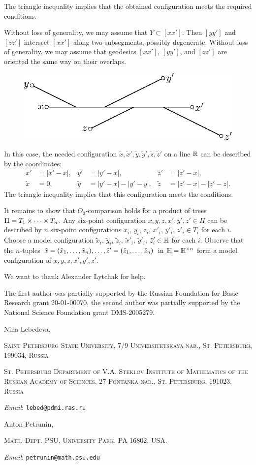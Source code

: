 \documentclass{article}
\makeatletter
\newcommand{\Addresses}{{\bigskip\footnotesize

\noindent Nina Lebedeva,
\par\nopagebreak
 \textsc{Saint Petersburg State University, 7/9 Universitetskaya nab., St. Petersburg, 199034, Russia}
\par
\nopagebreak
 \textsc{St. Petersburg Department of V.A. Steklov Institute of Mathematics of the Russian Academy of Sciences, 27 Fontanka nab., St. Petersburg, 191023, Russia}
  \par\nopagebreak
  \textit{Email}: \texttt{lebed@pdmi.ras.ru}

\medskip

\noindent   Anton Petrunin, 
\par\nopagebreak
 \textsc{Math. Dept. PSU, University Park, PA 16802, USA.}
  \par\nopagebreak
  \textit{Email}: \texttt{petrunin@math.psu.edu}
  
}}
\makeatother
\begin{document}
The triangle inequality implies that the obtained configuration meets the required conditions.

Without loss of generality, we may assume that $Y\subset [xx']$.
Then $[yy']$ and $[zz']$ intersect $[xx']$ along two subsegments, possibly degenerate.
Without loss of generality, we may assume that geodesics $[xx']$, $[yy']$, and $[zz']$ are oriented the same way on their overlaps.

\begin{figure}[ht!]
\centering
\includegraphics{mppics/pic-60}
\end{figure}

In this case, the needed configuration $\tilde x,\tilde x',\tilde y,\tilde y',\tilde z,\tilde z'$ on a line $\mathbb{R}$ can be described by the coordinates:
\begin{align*}
\tilde x'&=|x'-x|,
&
\tilde y'&=|y'-x|,
&
\tilde z'&=|z'-x|,
\\
\tilde x&=0,
&
\tilde y&=|y'-x|-|y'-y|,
&
\tilde z&=|z'-x|-|z'-z|.
\end{align*}
The triangle inequality implies that this configuration meets the conditions. 

It remains to show that $O_3$-comparison holds for a product of trees $\Pi\z=T_1\times \dots\times T_n$.
Any six-point configuration $x,y,z,x',y',z'\in \Pi$ can be described by $n$ six-point configurations $x_i$, $y_i$, $z_i$, $x'_i$, $y'_i$, $z'_i\in T_i$ for each $i$.
Choose a model configuration $\tilde x_i$, $\tilde y_i$, $\tilde z_i$, $\tilde x'_i$, $\tilde y'_i$, $\tilde z'_i\in \mathbb H$ for each $i$.
Observe that the $n$-tuples $\tilde x=(\tilde x_1,\dots, \tilde x_n),\z\dots,\tilde z'=(\tilde z_1,\dots, \tilde z_n)$ in $\mathbb H=\mathbb H^{\times n}$ form a model configuration of $x,y,z,x',y',z'$.
\qeds

We want to thank Alexander Lytchak for help. 

The first author was partially supported by the Russian Foundation for Basic Research grant 20-01-00070, the second author was partially supported by the National Science Foundation grant DMS-2005279.

{\sloppy
\printbibliography[heading=bibintoc]
\fussy
}

\Addresses
\end{document}
